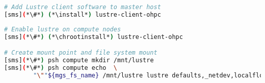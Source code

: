 
\begin{lstlisting}[language=bash,keywords={},upquote=true]
# Add Lustre client software to master host
[sms](*\#*) (*\install*) lustre-client-ohpc
\end{lstlisting}

\begin{lstlisting}[language=bash,keywords={},upquote=true]
# Enable lustre on compute nodes
[sms](*\#*) (*\chrootinstall*) lustre-client-ohpc

# Create mount point and file system mount
[sms](*\#*) psh compute mkdir /mnt/lustre
[sms](*\#*) psh compute echo  \ 
        "\""${mgs_fs_name} /mnt/lustre lustre defaults,_netdev,localflock,retry=2 0 0"\"" \>\> /etc/fstab
\end{lstlisting}

